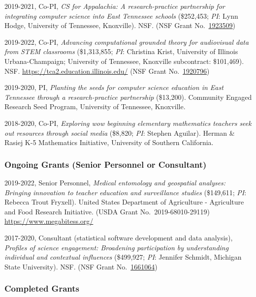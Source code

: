 \documentclass[
  11pt,
]{article}
\begin{document}
2019-2021, Co-PI, \emph{CS for Appalachia: A research-practice
partnership for integrating computer science into East Tennessee
schools} (\$252,453; \emph{PI}: Lynn Hodge, University of Tennessee,
Knoxville). NSF. (NSF Grant
No.~\href{https://www.nsf.gov/awardsearch/showAward?AWD_ID=1923509\&HistoricalAwards=false}{1923509})

2019-2022, Co-PI, \emph{Advancing computational grounded theory for
audiovisual data from STEM classrooms} (\$1,313,855; \emph{PI}:
Christina Krist, University of Illinois Urbana-Champaign; University of
Tennessee, Knoxville subcontract: \$101,469). NSF.
\url{https://tca2.education.illinois.edu/} (NSF Grant
No.~\href{https://www.nsf.gov/awardsearch/showAward?AWD_ID=1920796\&HistoricalAwards=false}{1920796})

2019-2020, PI, \emph{Planting the seeds for computer science education
in East Tennessee through a research-practice partnership} (\$13,200).
Community Engaged Research Seed Program, University of Tennessee,
Knoxville.

2018-2020, Co-PI, \emph{Exploring wow beginning elementary mathematics
teachers seek out resources through social media} (\$8,820; \emph{PI}:
Stephen Aguilar). Herman \& Rasiej K-5 Mathematics Initiative,
University of Southern California.

\hypertarget{ongoing-grants-senior-personnel-or-consultant}{%
\subsubsection{Ongoing Grants (Senior Personnel or
Consultant)}\label{ongoing-grants-senior-personnel-or-consultant}}

2019-2022, Senior Personnel, \emph{Medical entomology and geospatial
analyses: Bringing innovation to teacher education and surveillance
studies} (\$149,611; \emph{PI}: Rebecca Trout Fryxell). United States
Department of Agriculture - Agriculture and Food Research Initiative.
(USDA Grant No.~2019-68010-29119) \url{https://www.megabitess.org/}

2017-2020, Consultant (statistical software development and data
analysis), \emph{Profiles of science engagement: Broadening
participation by understanding individual and contextual influences}
(\$499,927; \emph{PI}: Jennifer Schmidt, Michigan State University).
NSF. (NSF Grant
No.~\href{https://nsf.gov/awardsearch/showAward?AWD_ID=1661064\&HistoricalAwards=false}{1661064})

\hypertarget{completed-grants}{%
\subsubsection{Completed Grants}\label{completed-grants}}
\end{document}
